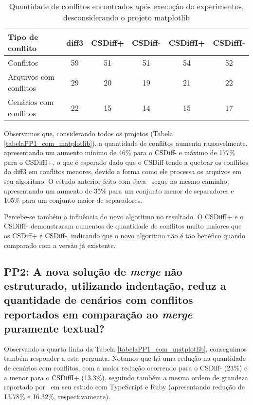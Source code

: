 \begin{table}[ht]
	\begin{center}
		\begin{tabular}{|l|c|c|c|c|c|}
			\hline
			\textbf{Tipo de conflito} & \textbf{diff3} & \textbf{CSDiff+} & \textbf{CSDiff-} & \textbf{CSDiffI+} & \textbf{CSDiffI-} \\
			\hline
			Conflitos                 & 59             & 51               & 51               & 54                & 52                \\
			Arquivos com conflitos    & 29             & 20               & 19               & 21                & 22                \\
			Cenários com conflitos    & 22             & 15               & 14               & 15                & 17                \\
			\hline
		\end{tabular}
	\end{center}
	\caption{Quantidade de conflitos encontrados após execução do experimentos, desconsiderando o
		projeto matplotlib}\label{tabelaPP1_sem_matplotlib}
\end{table}

Observamos que, considerando todos os projetos (Tabela \ref{tabelaPP1_com_matplotlib}), a quantidade de conflitos aumenta
razoavelmente, apresentando um aumento mínimo de 46\% para o CSDiff- e máximo de 177\% para o CSDiffI+, o que é esperado dado que o
CSDiff tende a quebrar os conflitos do diff3 em conflitos menores, devido a forma como ele processa os arquivos em seu algoritmo.
O estudo anterior feito com Java~\cite{clem21} segue no mesmo caminho, apresentando um aumento de 35\% para um conjunto menor de
separadores e 105\% para um conjunto maior de separadores.

Percebe-se também a influência do novo algoritmo no resultado. O CSDiffI+ e o CSDiffI- demonstraram aumentos de quantidade de
conflitos muito maiores que os CSDiff+ e CSDiff-, indicando que o novo algoritmo não é tão benéfico quando comparado com a
versão já existente.

\subsection{PP2: A nova solução de \emph{merge} não estruturado, utilizando indentação,
	reduz a quantidade de cenários com conflitos reportados em comparação ao \emph{merge} puramente textual?}
Observando a quarta linha da Tabela \ref{tabelaPP1_com_matplotlib}, conseguimos também responder a esta pergunta. Notamos
que há uma redução na quantidade de cenários com conflitos, com a maior redução ocorrendo para o CSDiff- (23\%) e a menor para o
CSDiffI+ (13.3\%), seguindo também a mesma ordem de grandeza reportado por~\citeauthor{heitor21} em seu estudo com TypeScript
e Ruby (apresentando redução de 13.78\% e 16.32\%, respectivamente).

